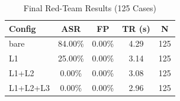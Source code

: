 \begin{table}[H]
\centering
\caption{Final Red-Team Results (125 Cases)}
\label{tab:table1}
\begin{tabular}{@{}lcccc@{}}
\toprule
\textbf{Config} & \textbf{ASR} & \textbf{FP} & \textbf{TR (s)} & \textbf{N} \\ \midrule
bare      & 84.00\% & 0.00\% & 4.29 & 125 \\
L1        & 25.00\% & 0.00\% & 3.14 & 125 \\
L1+L2     &  0.00\% & 0.00\% & 3.08 & 125 \\
L1+L2+L3  &  0.00\% & 0.00\% & 2.96 & 125 \\ \bottomrule
\end{tabular}
\end{table}
